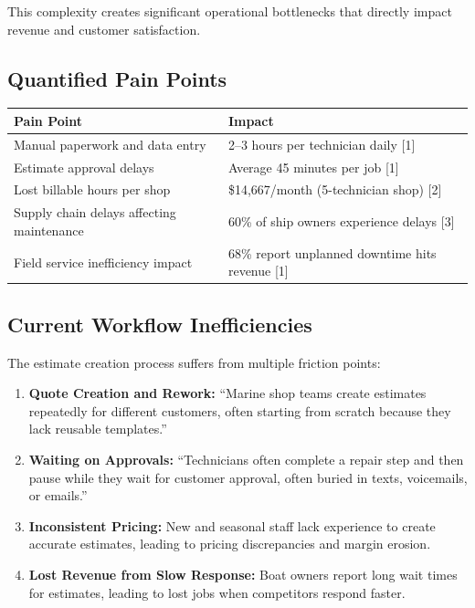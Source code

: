\documentclass[11pt,a4paper]{article}
\begin{document}
This complexity creates significant operational bottlenecks that directly impact revenue and customer satisfaction.

\subsection{Quantified Pain Points}

\begin{table}[H]
\centering
\small
\begin{tabularx}{\textwidth}{@{}L{5cm}L{8.5cm}@{}}
\toprule
\textbf{Pain Point} & \textbf{Impact} \\
\midrule
Manual paperwork and data entry & 2--3 hours per technician daily [1] \\
Estimate approval delays & Average 45 minutes per job [1] \\
Lost billable hours per shop & \$14,667/month (5-technician shop) [2] \\
Supply chain delays affecting maintenance & 60\% of ship owners experience delays [3] \\
Field service inefficiency impact & 68\% report unplanned downtime hits revenue [1] \\
\bottomrule
\end{tabularx}
\end{table}

\subsection{Current Workflow Inefficiencies}

The estimate creation process suffers from multiple friction points:

\begin{enumerate}[leftmargin=*]
    \item \textbf{Quote Creation and Rework:} ``Marine shop teams create estimates repeatedly for different customers, often starting from scratch because they lack reusable templates.''
    
    \item \textbf{Waiting on Approvals:} ``Technicians often complete a repair step and then pause while they wait for customer approval, often buried in texts, voicemails, or emails.''
    
    \item \textbf{Inconsistent Pricing:} New and seasonal staff lack experience to create accurate estimates, leading to pricing discrepancies and margin erosion.
    
    \item \textbf{Lost Revenue from Slow Response:} Boat owners report long wait times for estimates, leading to lost jobs when competitors respond faster.
\end{enumerate}
\end{document}

